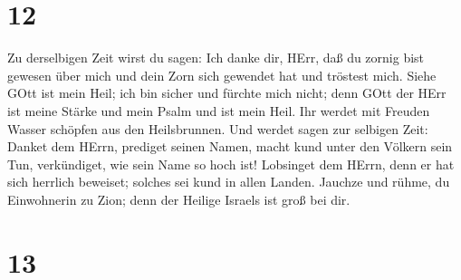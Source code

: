 \hypertarget{section-11}{%
\section{12}\label{section-11}}

 Zu derselbigen Zeit wirst du sagen: Ich danke dir, HErr,
daß du zornig bist gewesen über mich und dein Zorn sich gewendet hat und
tröstest mich.  Siehe GOtt ist mein Heil; ich bin sicher und
fürchte mich nicht; denn GOtt der HErr ist meine Stärke und mein Psalm
und ist mein Heil.  Ihr werdet mit Freuden Wasser schöpfen
aus den Heilsbrunnen.  Und werdet sagen zur selbigen Zeit:
Danket dem HErrn, prediget seinen Namen, macht kund unter den Völkern
sein Tun, verkündiget, wie sein Name so hoch ist!  Lobsinget
dem HErrn, denn er hat sich herrlich beweiset; solches sei kund in allen
Landen.  Jauchze und rühme, du Einwohnerin zu Zion; denn der
Heilige Israels ist groß bei dir.

\hypertarget{section-12}{%
\section{13}\label{section-12}}

